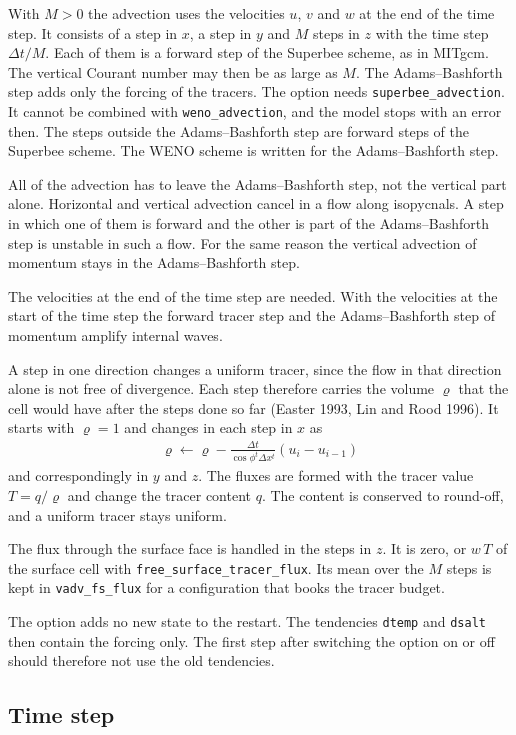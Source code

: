 \documentclass[12pt]{article}
\newcommand{\beeq}  { \begin{eqnarray*} }
\newcommand{\eeeq}  { \end{eqnarray*}}
\newcommand{\lk}{\left(}
\newcommand{\rk}{\right)}
\begin{document}
With $M > 0$ the advection uses the velocities $u$, $v$ and $w$ at the end of the time step.
It consists of a step in $x$, a step in $y$ and $M$ steps in $z$ with the time step $\Delta t/M$.
Each of them is a forward step of the Superbee scheme, as in MITgcm.
The vertical Courant number may then be as large as $M$.
The Adams--Bashforth step adds only the forcing of the tracers.
The option needs \verb|superbee_advection|.
It cannot be combined with \verb|weno_advection|, and the model stops with an error then.
The steps outside the Adams--Bashforth step are forward steps of the Superbee scheme.
The WENO scheme is written for the Adams--Bashforth step.

All of the advection has to leave the Adams--Bashforth step, not the vertical part alone.
Horizontal and vertical advection cancel in a flow along isopycnals.
A step in which one of them is forward and the other is part of the Adams--Bashforth step is unstable in such a flow.
For the same reason the vertical advection of momentum stays in the Adams--Bashforth step.

The velocities at the end of the time step are needed.
With the velocities at the start of the time step the forward tracer step and the Adams--Bashforth step of momentum amplify internal waves.

A step in one direction changes a uniform tracer, since the flow in that direction alone is not free of divergence.
Each step therefore carries the volume $\varrho$ that the cell would have after the steps done so far (Easter 1993, Lin and Rood 1996).
It starts with $\varrho = 1$ and changes in each step in $x$ as
\beeq
 \varrho \leftarrow \varrho - \frac{\Delta t}{\cos \phi^t \Delta x^t} \lk u_i - u_{i-1} \rk
\eeeq
and correspondingly in $y$ and $z$.
The fluxes are formed with the tracer value $T = q/\varrho$ and change the tracer content $q$.
The content is conserved to round-off, and a uniform tracer stays uniform.

The flux through the surface face is handled in the steps in $z$.
It is zero, or $w\, T$ of the surface cell with \verb|free_surface_tracer_flux|.
Its mean over the $M$ steps is kept in \verb|vadv_fs_flux| for a configuration that books the tracer budget.

The option adds no new state to the restart.
The tendencies \verb|dtemp| and \verb|dsalt| then contain the forcing only.
The first step after switching the option on or off should therefore not use the old tendencies.

\subsection*{Time step}
\end{document}
